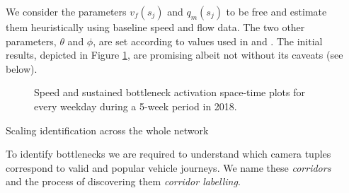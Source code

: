 \documentclass[final]{beamer}
\newlength{\sepwidth}
\newlength{\colwidth}
\newcommand{\separatorcolumn}{\begin{column}{\sepwidth}\end{column}}
\begin{document}
\begin{frame}[t]
\begin{columns}[t]
\separatorcolumn

\begin{column}{\colwidth}


  We consider the parameters $v_f(s_j)$ and $q_m(s_j)$ to be free and estimate
  them heuristically using baseline speed and flow data. The two other
  parameters, $\theta$ and $\phi$, are set according to values used in
  \cite{chen2004} and \cite{he2016}. The initial results, depicted in Figure
  \ref{fig:motivating_example_5week}, are promising albeit not without its
  caveats (see below).

  \begin{figure}[t]
    \centering
    \caption{Speed and sustained bottleneck activation space-time plots for
             every weekday during a 5-week period in 2018.}
    \label{fig:motivating_example_5week}
  \end{figure}

  \begin{block}{Scaling identification across the whole network}


      To identify bottlenecks we are required to understand which camera tuples
      correspond to valid and popular vehicle journeys. We name these
      \emph{corridors} and the process of discovering them
      \emph{corridor labelling}.


\end{block}
\end{column}
\end{columns}
\end{frame}
\end{document}
